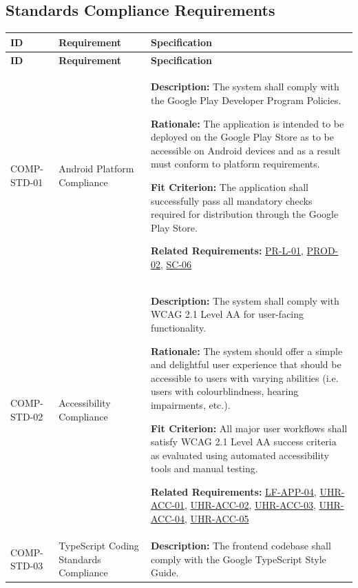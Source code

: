 \documentclass[12pt]{article}
\begin{document}
\subsection{Standards Compliance Requirements}

\small
\setlength{\tabcolsep}{4pt}
\begin{xltabular}{\textwidth}{|p{2.6cm}|p{3.4cm}|X|}
\hline
\textbf{ID} & \textbf{Requirement} & \textbf{Specification} \\
\hline
\endfirsthead
\hline
\textbf{ID} & \textbf{Requirement} & \textbf{Specification} \\
\hline
\endhead

COMP-STD-01\hypertarget{req:COMP-STD-01}{} & 
Android Platform Compliance & 
\textbf{Description:} The system shall comply with the Google Play Developer Program Policies. 

\textbf{Rationale:} The application is intended to be deployed on the Google Play Store as to be accessible on Android devices and as a result must conform to platform requirements. 

\textbf{Fit Criterion:} The application shall successfully pass all mandatory checks required for distribution through the Google Play Store.

\textbf{Related Requirements:} \hyperlink{req:PR-L-01}{PR-L-01}, \hyperlink{req:PROD-02}{PROD-02}, \hyperlink{req:SC-06}{SC-06}\\
\hline

COMP-STD-02\hypertarget{req:COMP-STD-02}{} & 
Accessibility Compliance & 
\textbf{Description:} The system shall comply with WCAG 2.1 Level AA for user-facing functionality. 

\textbf{Rationale:} The system should offer a simple and delightful user experience that should be accessible to users with varying abilities (i.e. users with colourblindness, hearing impairments, etc.).

\textbf{Fit Criterion:} All major user workflows shall satisfy WCAG 2.1 Level AA success criteria as evaluated using automated accessibility tools and manual testing.

\textbf{Related Requirements:} \hyperlink{req:LF-APP-04}{LF-APP-04}, \hyperlink{req:UHR-ACC-01}{UHR-ACC-01}, \hyperlink{req:UHR-ACC-02}{UHR-ACC-02}, \hyperlink{req:UHR-ACC-03}{UHR-ACC-03}, \hyperlink{req:UHR-ACC-04}{UHR-ACC-04}, \hyperlink{req:UHR-ACC-05}{UHR-ACC-05}\\
\hline

COMP-STD-03\hypertarget{req:COMP-STD-03}{} & 
TypeScript Coding Standards Compliance & 
\textbf{Description:} The frontend codebase shall comply with the Google TypeScript Style Guide. 


\end{xltabular}
\end{document}
